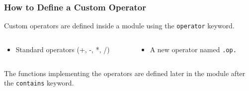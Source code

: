 \begin{frame}[fragile]
  \frametitle{How to Define a Custom Operator}
  Custom operators are defined inside a module using the \texttt{operator} keyword.
  \vspace*{2mm}

  \begin{columns}[T]
    \begin{column}{0.5\textwidth}
      \begin{itemize}
            \item Standard operators (+, -, *, /) 
      \end{itemize}
    \end{column}

    \begin{column}{0.5\textwidth}
      \begin{itemize}
            \item A new operator named \texttt{.op.} 
      \end{itemize}    \end{column}
  \end{columns}

  \vspace*{2mm}
  The functions implementing the operators are defined later in the module after the \texttt{contains} keyword.
\end{frame}
